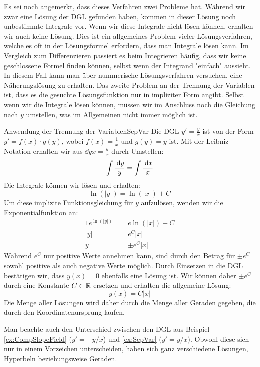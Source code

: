Es sei noch angemerkt, dass dieses Verfahren zwei Probleme hat. Während wir zwar eine Lösung der DGL gefunden haben, kommen in dieser Lösung noch unbestimmte Integrale vor. Wenn wir diese Integrale nicht lösen können, erhalten wir auch keine Lösung. Dies ist ein allgemeines Problem vieler Lösungsverfahren, welche es oft in der Lösungsformel erfordern, dass man Integrale lösen kann. Im Vergleich zum Differenzieren passiert es beim Integrieren häufig, dass wir keine geschlossene Formel finden können, selbst wenn der Integrand "einfach" aussieht. In diesem Fall kann man über nummerische Lösungsverfahren versuchen, eine Näherungslösung zu erhalten. Das zweite Problem an der Trennung der Variablen ist, dass es die gesuchte Lösungsfunktion nur in impliziter Form angibt. Selbst wenn wir die Integrale lösen können, müssen wir im Anschluss noch die Gleichung nach $y$ umstellen, was im Allgemeinen nicht immer möglich ist.

\begin{example}{Anwendung der Trennung der Variablen}{SepVar}
    Die DGL $y'=\frac{y}{x}$ ist von der Form $y' = f(x) \cdot g(y)$, wobei $f(x)=\frac{1}{x}$ und $g(y)=y$ ist. Mit der Leibniz-Notation erhalten wir aus $\dd{y}{x} = \frac{y}{x}$ durch Umstellen:
    $$
        \int \frac{\:\mathrm{d}{y}}{y} = \int \frac{\:\mathrm{d}{x}}{x}
    $$
    Die Integrale können wir lösen und erhalten:
    $$
        \ln(|y|) = \ln(|x|) + C
    $$
    Um diese implizite Funktionsgleichung für $y$ aufzulösen, wenden wir die Exponentialfunktion an:
    \begin{alignat}{1}
        e^{\ln(|y|)} &= e{\ln(|x|) + C} \\
        |y|          &= e^C |x| \\
        y            &= \pm e^C |x|
    \end{alignat}
    Während $e^C$ nur positive Werte annehmen kann, sind durch den Betrag für $\pm e^C$ sowohl positive als auch negative Werte möglich. Durch Einsetzen in die DGL bestätigen wir, dass $y(x) =0$ ebenfalls eine Lösung ist. Wir können daher $\pm e^C$ durch eine Konstante $C\in\mathbb{R}$ ersetzen und erhalten die allgemeine Lösung:
    $$
        y(x) = C |x|
    $$
    Die Menge aller Lösungen wird daher durch die Menge aller Geraden gegeben, die durch den Koordinatenursprung laufen.
\end{example}

Man beachte auch den Unterschied zwischen den DGL aus Beispiel \ref{ex:CompSlopeField} ($y'=-y/x$) und \ref{ex:SepVar} ($y'=y/x$). Obwohl diese sich nur in einem Vorzeichen unterscheiden, haben sich ganz verschiedene Lösungen, Hyperbeln beziehungsweise Geraden.

